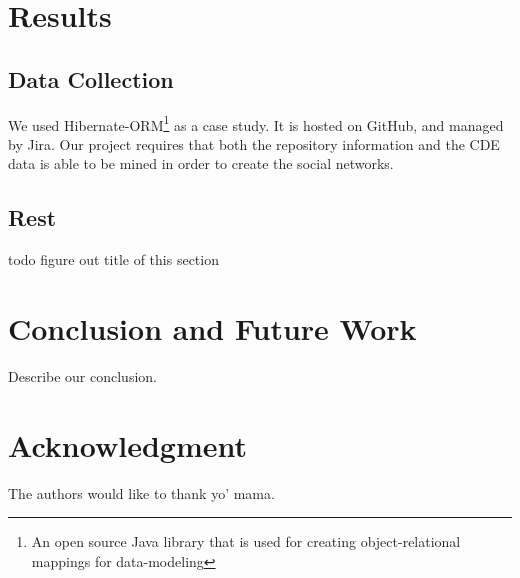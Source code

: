\documentclass[conference]{IEEEtran}
\begin{document}
\section{Results}
\subsection{Data Collection}
We used Hibernate-ORM\footnote{An open source Java library that is used for creating object-relational mappings for data-modeling} as a case study.  It is hosted on GitHub, and managed by Jira\footnotemark[2].  Our project requires that both the repository information and the CDE data is able to be mined in order to create the social networks.

\subsection{Rest}
todo figure out title of this section

\section{Conclusion and Future Work}
Describe our conclusion.


\section*{Acknowledgment}
The authors would like to thank yo' mama.





\end{document}
